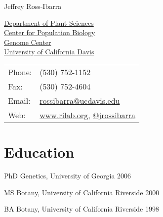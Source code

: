 \documentclass[letterpaper,10pt]{article}
\def\name{Jeffrey Ross-Ibarra}
\renewenvironment{itemize}{
  \begin{list}{}{
    \setlength{\leftmargin}{1.5em}
  }
}{
  \end{list}
}
\begin{document}
{\huge \name}


\vspace{0.25in}

\begin{minipage}{0.55\linewidth}
  \href{http://www.plantsciences.ucdavis.edu/plantsciences/}{Department of Plant Sciences}\\
  \href{http://cpb.ucdavis.edu/}{Center for Population Biology}\\
  \href{http://www.genomecenter.ucdavis.edu/}{Genome Center}\\
  \href{http://www.ucdavis.edu/}{University of California Davis} \\
\end{minipage}
\begin{minipage}{0.35\linewidth}
  \begin{tabular}{ll}
    Phone: & (530) 752-1152 \\
    Fax: &  (530) 752-4604 \\
    Email: & \href{mailto:rossibarra@ucdavis.edu}{rossibarra@ucdavis.edu} \\
    Web: & \href{http://www.rilab.org/}{www.rilab.org}, \href{http://www.twitter.com/jrossibarra/}{@jrossibarra} \\
  \end{tabular}
\end{minipage}

\section*{Education}
\begin{itemize}
\setlength\itemsep{0ex}
 \item PhD Genetics, University of Georgia 2006
  \item MS Botany, University of California Riverside 2000
 \item BA Botany, University of California Riverside 1998
\end{itemize}

\end{document}

